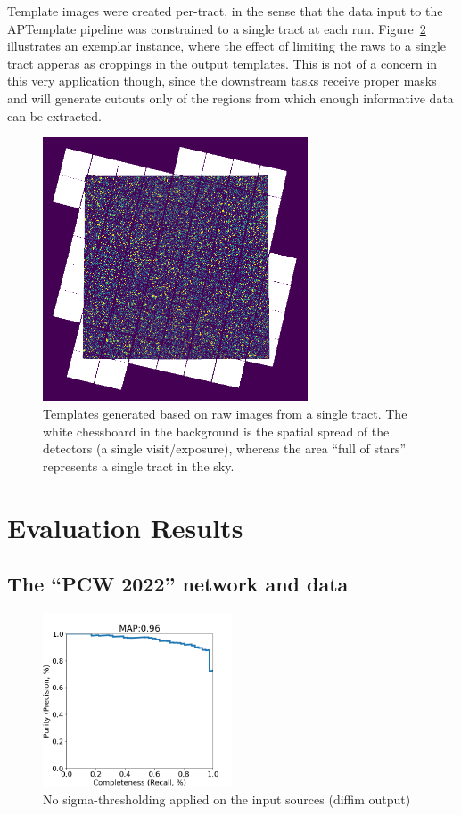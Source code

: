 \documentclass[DM,authoryear,toc]{lsstdoc}
\begin{document}
Template images were created per-tract, in the sense that the data input to the APTemplate pipeline was constrained to a single tract at each run. Figure~\ref{fig:tract_templates} illustrates an exemplar instance, where the effect of limiting the raws to a single tract apperas as croppings in the output templates. This is not of a concern in this very application though, since the downstream tasks receive proper masks and will generate cutouts only of the regions from which enough informative data can be extracted.

\begin{figure}[h]
  \centering
  \includegraphics[width=0.7\textwidth]{tract_templates.png}
  \caption{Templates generated based on raw images from a single tract. The white chessboard in the background is the spatial spread of the detectors (a single visit/exposure), whereas the area ``full of stars'' represents a single tract in the sky.}
  \label{fig:tract_templates}
\end{figure}


\section{Evaluation Results}

\subsection{The ``PCW 2022'' network and data}
\begin{figure}[h]
  \centering
  \includegraphics[width=0.5\textwidth]{precrec___checkpoint_epoch0000087_iter0200000____rbdata_data_npy_data_gt1M___posw_30.png}
  \caption{No sigma-thresholding applied on the input sources (diffim output)}
  \label{fig:tract_templates}
\end{figure}
\end{document}
